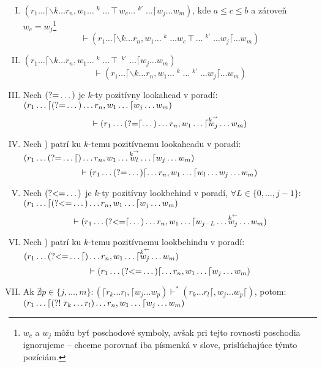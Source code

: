 \begin{df}
\begin{enumerate}[I.]
\item $\displaystyle{(r_1 \dots \lceil \backslash k \dots r_n,w_1\dots\mathop{w_a}^k\ldots \intercal w_c \dots \mathop{w_b}^{k'} \dots \lceil w_j\dots w_m)}$, kde $a\leq c\leq b$ a zároveň $w_c = w_j$\footnote{$w_c$ a $w_j$ môžu byť poschodové symboly, avšak pri tejto rovnosti poschodia ignorujeme -- chceme porovnať iba písmenká v slove, prislúchajúce týmto pozíciám.}
$$\vdash(r_1 \dots \lceil \backslash k \dots r_n,w_1\dots\mathop{w_a}^k\dots w_c\intercal \dots \mathop{w_b}^{k'} \dots  w_j\lceil\dots w_m)$$
\item $\displaystyle{(r_1 \dots \lceil \backslash k \dots r_n,w_1\dots\mathop{w_a}^k\ldots \intercal  \mathop{w_b}^{k'} \dots \lceil w_j\dots w_m)}$
$$\vdash(r_1 \dots \lceil \backslash k \dots r_n,w_1\dots\mathop{w_a}^k\dots \mathop{w_b}^{k'} \dots  w_j\lceil\dots w_m)$$
\item Nech $\text{(?=} \dots)$ je $k$-ty pozitívny lookahead v poradí: 
\\ $\displaystyle{(r_1\dots \lceil \text{(?=}\dots) \dots r_n, w_1\dots\lceil w_j\dots w_m )}$
$$ \vdash(r_1\dots \text{(?=}\lceil\dots) \dots r_n, w_1\dots\lceil \mathop{w_j}^{\mathop{k}^\rightarrow}\dots w_m ) $$
\item Nech ) patrí ku $k$-temu pozitívnemu lookaheadu v poradí: 
\\ $\displaystyle{(r_1\dots \text{(?=}\dots\lceil) \dots r_n, w_1\dots \mathop{w_l}^{\mathop{k}^\rightarrow}\dots\lceil w_j\dots w_m )} $
$$ \vdash(r_1\dots \text{(?=}\dots)\lceil \dots r_n, w_1\dots \lceil w_l \dots w_j\dots w_m ) $$
\item Nech $\text{(?\textless =}\dots)$ je $k$-ty pozitívny lookbehind v poradí, $\forall L\in\lbrace 0,\dots, j-1\rbrace$:
\\ $\displaystyle{(r_1\dots \lceil \text{(?\textless =}\dots) \dots r_n, w_1\dots\lceil w_j\dots w_m )}$
$$ \vdash (r_1\dots \text{(?\textless =}\lceil\dots) \dots r_n, w_1\dots\lceil w_{j-L}\dots \mathop{w_j}^{\mathop{k}^\leftarrow} \dots w_m ) $$
\item Nech ) patrí ku $k$-temu pozitívnemu lookbehindu v poradí:
\\ $\displaystyle{(r_1\dots \text{(?\textless =}\dots\lceil) \dots r_n, w_1\dots \lceil \mathop{w_j}^{\mathop{k}^\leftarrow} \dots w_m )}$
$$ \vdash(r_1\dots \text{(?\textless =}\dots)\lceil \dots r_n, w_1 \dots \lceil w_j \dots w_m ) $$
\item Ak $\nexists p \in \lbrace j,\dots,m\rbrace: (\lceil r_k\dots r_l,\lceil w_j\dots w_p) \vdash^* (r_k\dots r_l\lceil, w_j\dots w_p \lceil)$, potom:
\\$\displaystyle{(r_1\dots\lceil \text{(?!~}r_{k}\dots r_{l} ) \dots r_n, w_1\dots \lceil w_j \dots w_m)}$

\end{enumerate}
\end{df}
